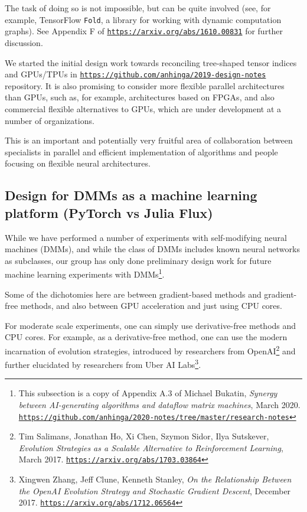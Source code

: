 \documentclass{article}
\begin{document}
The task of doing so is not impossible, but can be quite involved (see, for example, TensorFlow {\tt Fold},
a library for working with dynamic computation graphs). See Appendix F of \href{https://arxiv.org/abs/1610.00831}{\tt https://arxiv.org/abs/1610.00831} for further discussion.

We started the initial design work towards reconciling tree-shaped tensor indices and GPUs/TPUs in
\href{https://github.com/anhinga/2019-design-notes}{\tt https://github.com/anhinga/2019-design-notes}
repository. It is also promising to consider more flexible parallel architectures than GPUs, such
as, for example, architectures based on FPGAs, and also commercial flexible alternatives to GPUs,
which are under development at a number of organizations. 

This is an important and potentially very fruitful area of collaboration between specialists in parallel and efficient implementation
of algorithms and people focusing on flexible neural architectures.

\subsection{Design for DMMs as a machine learning platform (PyTorch vs Julia Flux)}

While we have performed a number of experiments with self-modifying neural machines (DMMs),
and while the class of DMMs includes known neural networks as subclasses,
our group has only done preliminary design work for future machine learning experiments with DMMs\footnote{This subsection
is a copy of Appendix A.3 of Michael Bukatin, {\em Synergy between AI-generating algorithms and dataflow matrix machines},
March 2020.
\href{https://github.com/anhinga/2020-notes/tree/master/research-notes}
{\tt https://github.com/anhinga/2020-notes/tree/master/research-notes}}.

Some of the dichotomies here are between gradient-based methods and gradient-free methods,
and also between GPU acceleration and just using CPU cores.

For moderate scale experiments, one can simply use derivative-free methods and CPU cores.
For example, as a derivative-free method, one can use the modern incarnation of evolution strategies, introduced by researchers from OpenAI\footnote{Tim Salimans, Jonathan Ho, Xi Chen, Szymon Sidor, Ilya Sutskever, {\em Evolution Strategies as a Scalable Alternative to Reinforcement Learning}, March 2017.
\href{https://arxiv.org/abs/1703.03864}{\tt https://arxiv.org/abs/1703.03864}}  and
further elucidated by researchers from Uber AI Labs\footnote{Xingwen Zhang, Jeff Clune, Kenneth Stanley,
{\em On the Relationship Between the OpenAI Evolution Strategy and Stochastic Gradient Descent}, December 2017.
\href{https://arxiv.org/abs/1712.06564}{\tt https://arxiv.org/abs/1712.06564}}. 
\end{document}
